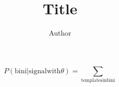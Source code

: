 \documentclass[12pt]{article}
\title{Title}
\author{Author}
\date{}
\begin{document}
\maketitle
\tableofcontents

\section{}

   \begin{equation}
   P(\mathrm{bin i} | \mathrm{signal with }\theta) = \sum_{\mathrm{templates in bin i}}
   \end{equation}

\subsection{}
\end{document}
